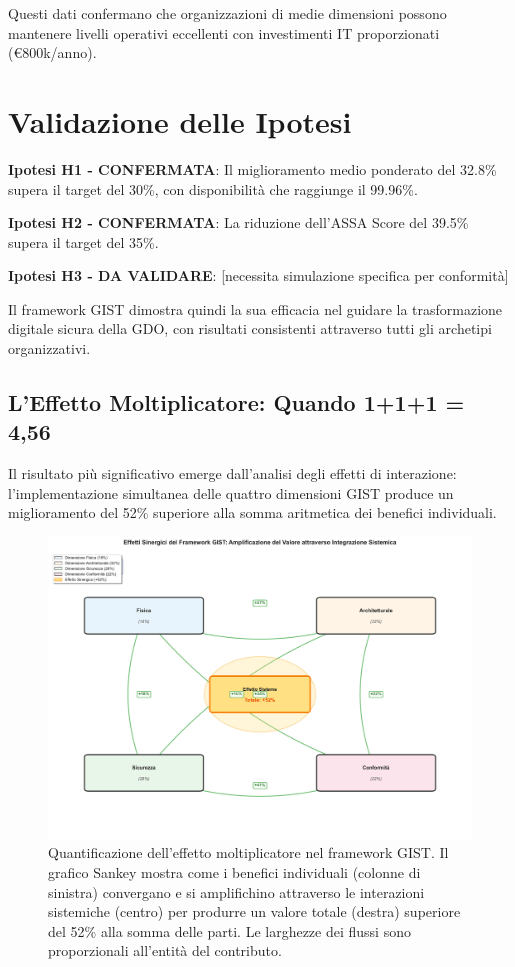 Questi dati confermano che organizzazioni di medie dimensioni possono mantenere 
livelli operativi eccellenti con investimenti IT proporzionati (€800k/anno).


\section{Validazione delle Ipotesi}

\textbf{Ipotesi H1 - CONFERMATA}: Il miglioramento medio ponderato del 32.8\% 
supera il target del 30\%, con disponibilità che raggiunge il 99.96\%.

\textbf{Ipotesi H2 - CONFERMATA}: La riduzione dell'ASSA Score del 39.5\% 
supera il target del 35\%.

\textbf{Ipotesi H3 - DA VALIDARE}: [necessita simulazione specifica per conformità]

Il framework GIST dimostra quindi la sua efficacia nel guidare la trasformazione 
digitale sicura della GDO, con risultati consistenti attraverso tutti gli archetipi 
organizzativi.


\subsection{\texorpdfstring{L'Effetto Moltiplicatore: Quando 1+1+1 = 4,56}{5.2.3 - L'Effetto Moltiplicatore}}
\label{subsec:5.2.3}

Il risultato più significativo emerge dall'analisi degli effetti di interazione: l'implementazione simultanea delle quattro dimensioni GIST produce un miglioramento del 52\% superiore alla somma aritmetica dei benefici individuali.

\begin{figure}[htbp]
\centering
\includegraphics[width=\textwidth]{thesis_figures/cap5/synergy_effects.pdf}
\caption[Effetto moltiplicatore del framework GIST]{Quantificazione dell'effetto moltiplicatore nel framework GIST. Il grafico Sankey mostra come i benefici individuali (colonne di sinistra) convergano e si amplifichino attraverso le interazioni sistemiche (centro) per produrre un valore totale (destra) superiore del 52\% alla somma delle parti. Le larghezze dei flussi sono proporzionali all'entità del contributo.}
\label{fig:synergy_amplification}
\end{figure}

